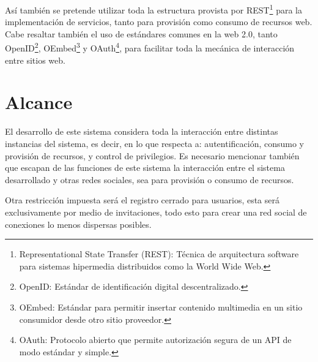 Así también se pretende utilizar toda la estructura provista por
REST\footnote{Representational State Transfer (REST): Técnica de arquitectura
software para sistemas hipermedia distribuidos como la World Wide Web.} para la
implementación de servicios, tanto para provisión como consumo de recursos web.
Cabe resaltar también el uso de estándares comunes en la web 2.0, tanto
OpenID\footnote{OpenID: Estándar de identificación digital descentralizado.},
OEmbed\footnote{OEmbed: Estándar para permitir insertar contenido multimedia en
un sitio consumidor desde otro sitio proveedor.} y OAuth\footnote{OAuth:
Protocolo abierto que permite autorización segura de un API de modo estándar y
simple.}, para facilitar toda la mecánica de interacción entre sitios web.

\section{Alcance}
El desarrollo de este sistema considera toda la interacción entre distintas
instancias del sistema, es decir, en lo que respecta a: autentificación,
consumo y provisión de recursos, y control de privilegios. Es necesario
mencionar también que escapan de las funciones de este sistema la interacción
entre el sistema desarrollado y otras redes sociales, sea para provisión o
consumo de recursos.

Otra restricción impuesta será el registro cerrado para usuarios, esta será
exclusivamente por medio de invitaciones, todo esto para crear una red social
de conexiones lo menos dispersas posibles.
